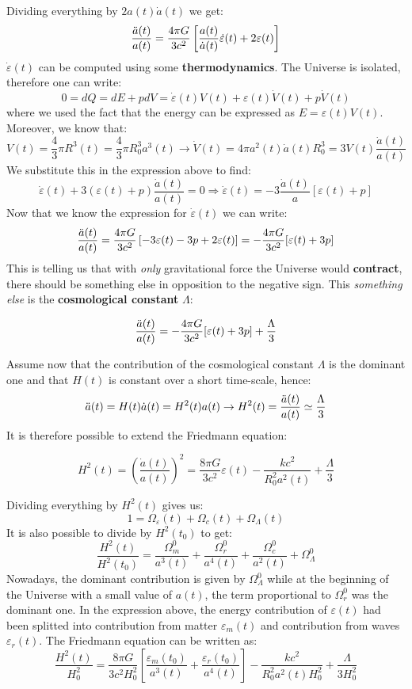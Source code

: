 \documentclass[10.75pt,a4paper,openright,bottom=2cm]{article}
\newcommand{\beginbox}[1]{\begin{tcolorbox}[width=\textwidth,colback={black!40},title={#1},colbacktitle={purple!55},coltitle=black]}
\renewcommand{\endbox}{\end{tcolorbox}\noindent}
\begin{document}
Dividing everything by $2a(t)\Dot{a}(t)$ we get:
\[
\frac{\Ddot{a}(t)}{a(t)}=\frac{4\pi G}{3c^2}\left[\frac{a(t)}{\Dot{a}(t)}\Dot{\varepsilon}(t)+2\varepsilon(t)\right]
\]
$\Dot{\varepsilon}(t)$ can be computed using some \textbf{thermodynamics}. The Universe is isolated, therefore one can write:
\[
0=dQ=dE+pdV=\Dot{\varepsilon}(t)V(t)+\varepsilon(t)\Dot{V}(t)+p\Dot{V}(t)
\]
where we used the fact that the energy can be expressed as $E=\varepsilon(t)V(t)$. Moreover, we know that:
\[
V(t)=\frac{4}{3}\pi R^3(t)=\frac{4}{3}\pi R_0^3a^3(t)\to\Dot{V}(t)=4\pi a^2(t)\Dot{a}(t)R_0^3=3V(t)\frac{\Dot{a}(t)}{a(t)}
\]
We substitute this in the expression above to find:
\[
\Dot{\varepsilon}(t)+3(\varepsilon(t)+p)\frac{\Dot{a}(t)}{a(t)}=0\Rightarrow\Dot{\varepsilon}(t)=-3\frac{\Dot{a}(t)}{a}[\varepsilon(t)+p]
\]
Now that we know the expression for $\Dot{\varepsilon}(t)$ we can write:
\[
\frac{\Ddot{a}(t)}{a(t)}=\frac{4\pi G}{3c^2}\left[-3\varepsilon(t)-3p+2\varepsilon(t)\right]=-\frac{4\pi G}{3c^2}[\varepsilon(t)+3p]
\]
This is telling us that with \textit{only} gravitational force the Universe would \textbf{contract}, there should be something else in opposition to the negative sign. This \textit{something else} is the \textbf{cosmological constant} $\Lambda$:
\beginbox{Cosmological Constant} 
\[
\frac{\Ddot{a}(t)}{a(t)}=-\frac{4\pi G}{3c^2}[\varepsilon(t)+3p]+\frac{\Lambda}{3}
\]
\endbox
Assume now that the contribution of the cosmological constant $\Lambda$ is the dominant one and that $H(t)$ is constant over a short time-scale, hence:
\[
\Ddot{a}(t)=H(t)\Dot{a}(t)=H^2(t)a(t)\to H^2(t)=\frac{\Ddot{a}(t)}{a(t)}\simeq\frac{\Lambda}{3}
\]
It is therefore possible to extend the Friedmann equation:
\beginbox{Full Metal Friedmann Equation}
\[
H^2(t)=\left(\frac{\Dot{a}(t)}{a(t)}\right)^2=\frac{8\pi G}{3c^2}\varepsilon(t)-\frac{kc^2}{R_0^2a^2(t)}+\frac{\Lambda}{3}
\]
\endbox
Dividing everything by $H^2(t)$ gives us:
\[
1=\Omega_\varepsilon(t)+\Omega_c(t)+\Omega_\Lambda(t)
\]
It is also possible to divide by $H^2(t_0)$ to get:
\[
\frac{H^2(t)}{H^2(t_0)}=\frac{\Omega_m^0}{a^3(t)}+\frac{\Omega_r^0}{a^4(t)}+\frac{\Omega_c^0}{a^2(t)}+\Omega_\Lambda^0
\]
Nowadays, the dominant contribution is given by $\Omega_\Lambda^0$ while at the beginning of the Universe with a small value of $a(t)$, the term proportional to $\Omega_r^0$ was the dominant one. In the expression above, the energy contribution of $\varepsilon(t)$ had been splitted into contribution from matter $\varepsilon_m(t)$ and contribution from waves $\varepsilon_r(t)$. The Friedmann equation can be written as:
\[
\frac{H^2(t)}{H_0^2}=\frac{8\pi G}{3c^2H_0^2}\left[\frac{\varepsilon_m(t_0)}{a^3(t)}+\frac{\varepsilon_r(t_0)}{a^4(t)}\right]-\frac{kc^2}{R_0^2a^2(t)H_0^2}+\frac{\Lambda}{3H_0^2}
\]
\end{document}
